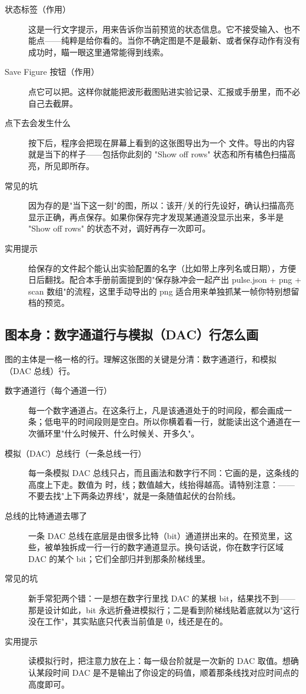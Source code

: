 \documentclass[11pt,oneside,openany]{book}
\begin{document}
\begin{description}
\item[状态标签（作用）] 这是一行文字提示，用来告诉你当前预览的状态信息。它不接受输入、也不能点——纯粹是给你看的。当你不确定图是不是最新、或者保存动作有没有成功时，瞄一眼这里通常能得到线索。
\item[Save Figure 按钮（作用）] 点它可以把。这样你就能把波形截图贴进实验记录、汇报或手册里，而不必自己去截屏。
\item[点下去会发生什么] 按下后，程序会把现在屏幕上看到的这张图导出为一个  文件。导出的内容就是当下的样子——包括你此刻的 "Show off rows" 状态和所有橘色扫描高亮，所见即所存。
\item[常见的坑] 因为存的是"当下这一刻"的图，所以：该开/关的行先设好，确认扫描高亮显示正确，再点保存。如果你保存完才发现某通道没显示出来，多半是 "Show off rows" 的状态不对，调好再存一次即可。
\item[实用提示] 给保存的文件起个能认出实验配置的名字（比如带上序列名或日期），方便日后翻找。配合本手册前面提到的"保存脉冲会一起产出 pulse.json + png + scan 数组"的流程，这里手动导出的 png 适合用来单独抓某一帧你特别想留档的预览。
\end{description}

\subsection{图本身：数字通道行与模拟（DAC）行怎么画}

图的主体是一格一格的行。理解这张图的关键是分清：数字通道行，和模拟（DAC 总线）行。

\begin{description}
\item[数字通道行（每个通道一行）] 每一个数字通道占。在这条行上，凡是该通道处于的时间段，都会画成一条；低电平的时间段则是空白。所以你横着看一行，就能读出这个通道在一次循环里"什么时候开、什么时候关、开多久"。
\item[模拟（DAC）总线行（一条总线一行）] 每一条模拟 DAC 总线只占，而且画法和数字行不同：它画的是，这条线的高度上下走。数值为  时，线；数值越大，线抬得越高。请特别注意：——不要去找"上下两条边界线"，就是一条随值起伏的台阶线。
\item[总线的比特通道去哪了] 一条 DAC 总线在底层是由很多比特（bit）通道拼出来的。在预览里，这些，被单独拆成一行一行的数字通道显示。换句话说，你在数字行区域 DAC 的某个 bit；它们全部归并到那条阶梯线里。
\item[常见的坑] 新手常犯两个错：一是想在数字行里找 DAC 的某根 bit，结果找不到——那是设计如此，bit 永远折叠进模拟行；二是看到阶梯线贴着底就以为"这行没在工作"，其实贴底只代表当前值是 0，线还是在的。
\item[实用提示] 读模拟行时，把注意力放在上：每一级台阶就是一次新的 DAC 取值。想确认某段时间 DAC 是不是输出了你设定的码值，顺着那条线找对应时间点的高度即可。
\end{description}
\end{document}
